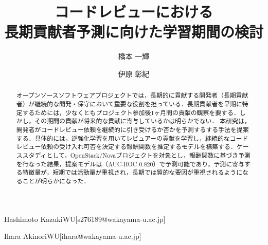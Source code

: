 \documentclass[submit,techrep,noauthor]{ipsj}
\begin{document}
\title{コードレビューにおける\\長期貢献者予測に向けた学習期間の検討}


\author{橋本 一輝}{Hashimoto Kazuki}{WU}[s276189@wakayama-u.ac.jp]
\author{伊原 彰紀}{Ihara Akinori}{WU}[ihara@wakayama-u.ac.jp]


\begin{abstract}
オープンソースソフトウェアプロジェクトでは，長期的に貢献する開発者（長期貢献者）が継続的な開発・保守において重要な役割を担っている．長期貢献者を早期に特定するためには，少なくともプロジェクト参加後1ヶ月間の貢献の観察を要する．しかし，その期間の貢献が将来的な貢献に寄与しているかは明らかでない．
本研究は，開発者がコードレビュー依頼を継続的に引き受けるか否かを予測するする手法を提案する．具体的には，逆強化学習を用いてレビュアーの貢献を学習し，継続的なコードレビュー依頼の受け入れ可否を決定する報酬関数を推定するモデルを構築する．ケーススタディとして，OpenStack/Novaプロジェクトを対象とし，報酬関数に基づき予測を行なった結果，提案モデルは（AUC-ROC 0.820）で予測可能であり，予測に寄与する特徴量が，短期では活動量が重視され，長期では質的な要因が重視されるようになることが明らかになった．
\end{abstract}


%
%
%
\end{document}
